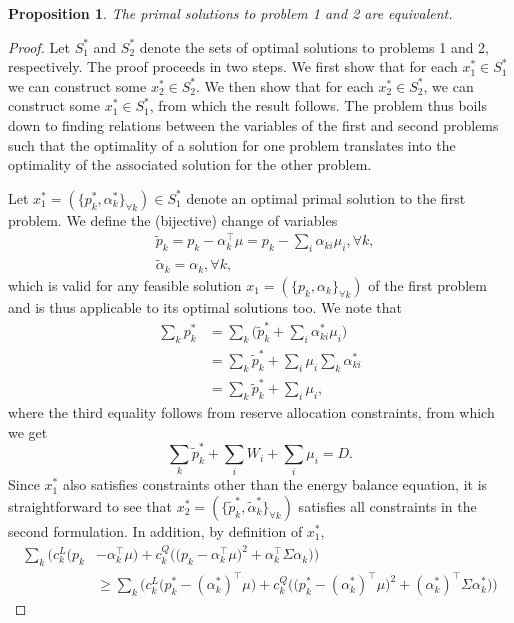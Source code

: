\documentclass{article}
\newtheorem{proposition}{Proposition}
\begin{document}
\begin{proposition}
The primal solutions to problem 1 and 2 are equivalent.
\end{proposition}
\begin{proof}
Let $S_1^*$ and $S_2^*$ denote the sets of optimal solutions to problems 1 and 2, respectively. The proof proceeds in two steps. We first show that for each $x_1^* \in S_1^*$ we can construct some $x_2^* \in S_2^*$. We then show that for each $x_2^* \in S_2^*$, we can construct some $x_1^* \in S_1^*$, from which the result follows. The problem thus boils down to finding relations between the variables of the first and second problems such that the optimality of a solution for one problem translates into the optimality of the associated solution for the other problem. 

Let $x_1^* = (\{p_k^*, \alpha_k^*\}_{\forall k}) \in S_1^*$ denote an optimal primal solution to the first problem. We define the (bijective) change of variables
\begin{align*}
&\tilde{p}_k = p_k - \alpha_k^\top \mu = p_k - \sum_i \alpha_{ki} \mu_i, \forall k,\\
&\tilde{\alpha}_k = \alpha_k, \forall k,
\end{align*}
which is valid for any feasible solution $x_1 = (\{p_k, \alpha_k\}_{\forall k})$ of the first problem and is thus applicable to its optimal solutions too. We note that
\begin{align*}
\sum_k p_k^* &= \sum_k \Big(\tilde{p}_k^* + \sum_i \alpha_{ki}^* \mu_i\Big)\\
&= \sum_k \tilde{p}_k^* + \sum_i \mu_i \sum_k \alpha_{ki}^*\\
&= \sum_k \tilde{p}_k^* + \sum_i \mu_i,
\end{align*}
where the third equality follows from reserve allocation constraints, from which we get 
\begin{equation*}
\sum_k \tilde{p}_k^* + \sum_i W_i + \sum_i \mu_i = D. 
\end{equation*}
Since $x_1^*$ also satisfies constraints other than the energy balance equation, it is straightforward to see that $x_2^* = (\{\tilde{p}_k^*, \tilde{\alpha}_k^*\}_{\forall k})$ satisfies all constraints in the second formulation. In addition, by definition of $x_1^*$,
\begin{align*}
\sum_k \Big(c_k^L\big(p_k &- \alpha_k^\top \mu\big) + c_k^Q \Big(\big(p_k - \alpha_{k}^\top \mu \big)^2 + \alpha_k^\top \Sigma \alpha_k\Big)\Big)\\
&\ge \sum_k \Big(c_k^L\big(p_k^* - (\alpha_k^*)^\top \mu\big) + c_k^Q \Big(\big(p_k^* - (\alpha_{k}^*)^\top \mu \big)^2 + (\alpha_k^*)^\top \Sigma \alpha_k^*\Big)\Big)

\end{align*}
\end{proof}
\end{document}
